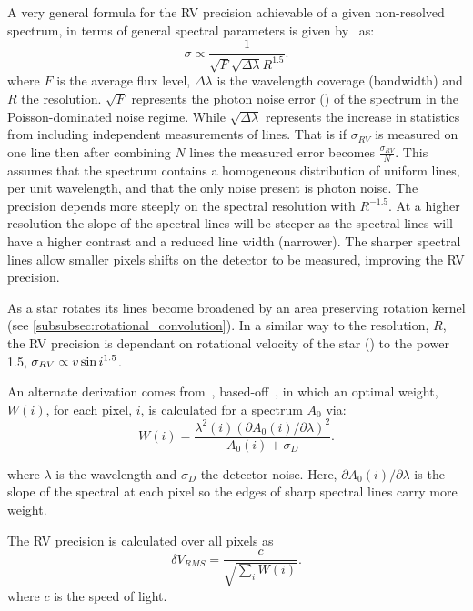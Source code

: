 A very general formula for the {RV} precision achievable of a given non-resolved spectrum, in terms of general spectral parameters is given by~\citet{hatzes_spectrograph_1992} as:
\begin{equation}
\sigma \propto \frac{1}{\sqrt{F} \sqrt{\Delta \lambda} R^{1.5}}.
\end{equation}
where \(F\) is the average flux level, \(\Delta \lambda\) is the wavelength coverage (bandwidth) and \(R\) the resolution.
$\sqrt{F}$ represents the photon noise error (\snr{}) of the spectrum in the {Poisson}-dominated noise regime.
While \(\sqrt{\Delta\lambda}\) represents the increase in statistics from including independent measurements of lines.
That is if \({\sigma}_{RV}\) is measured on one line then after combining \(N\) lines the measured error becomes \(\frac{{\sigma}_{RV}}{N}\).
This assumes that the spectrum contains a homogeneous distribution of uniform lines, per unit wavelength, and that the only noise present is photon noise.
The precision depends more steeply on the spectral resolution with $R^{-1.5}$. At a higher resolution the slope of the spectral lines will be steeper as the spectral lines will have a higher contrast and a reduced line width (narrower).
The sharper spectral lines allow smaller pixels shifts on the detector to be measured, improving the RV precision.

As a star rotates its lines become broadened by an area preserving rotation kernel (see \cref{subsubsec:rotational_convolution}).
In a similar way to the resolution, \(R\), the {RV} precision is dependant on rotational velocity of the star (\Vsini) to the power 1.5, $\sigma_{RV} \propto{v\sin{i}}^{1.5}$.

An alternate derivation comes from~\citet{bouchy_fundamental_2001}, based-off~\citet{connes_absolute_1985}, in which an optimal weight, \(W(i)\), for each pixel, \(i\), is calculated for a spectrum $A_0$ via:
\begin{equation}
    W(i) = \frac{\lambda^{2}(i) {(\partial A_0(i)/\partial\lambda)}^{2}}{A_0(i) + \sigma_D}. \label{eqn:pixel_weigth}
\end{equation}

where \(\lambda\) is the wavelength and \(\sigma_D\) the detector noise. Here, \(\partial A_0(i)/\partial\lambda\) is the slope of the spectral at each pixel so the edges of sharp spectral lines carry more weight.

The {RV} precision is calculated over all pixels as
\begin{equation}
    \delta V_{RMS} = \frac{c}{\sqrt{\sum\limits_i W(i)}}.
\end{equation}
where \(c\) is the speed of light.

